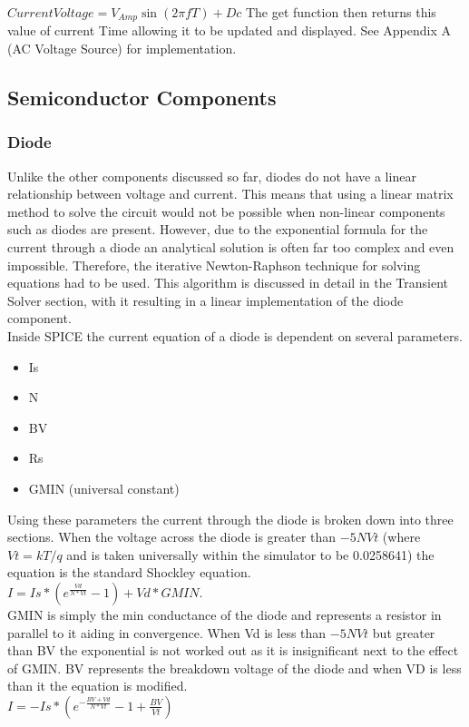 \documentclass{article}
\begin{document}
$ CurrentVoltage = V_{Amp}  \sin{(2\pi f T)} + Dc $
\medbreak
The get function then returns this value of current Time allowing it to be updated and displayed.
\bigbreak
See Appendix A (AC Voltage Source) for implementation.
\newpage

\subsection{Semiconductor Components}
\subsubsection{Diode}
Unlike the other components discussed so far, diodes do not have a linear relationship between voltage and current. This means that using a linear matrix method to solve the circuit would not be possible when non-linear components such as diodes are present. However, due to the exponential formula for the current through a diode an analytical solution is often far too complex and even impossible. Therefore, the iterative Newton-Raphson technique for solving equations had to be used. This algorithm is discussed in detail in the Transient Solver section, with it resulting in a linear implementation of the diode component.
\\
Inside SPICE the current equation of a diode is dependent on several parameters. 
\begin{itemize}
    \item Is
    \item N
    \item BV
    \item Rs
    \item GMIN (universal constant)
\end{itemize}
Using these parameters the current through the diode is broken down into three sections. When the voltage across the diode is greater than $-5NVt$ (where $Vt = kT/q$ and is taken universally within the simulator to be 0.0258641) the equation is the standard Shockley equation.\bigbreak \\ $I = Is*(e^{\frac{Vd}{N*Vt}}-1) + Vd*GMIN$. \\\bigbreak GMIN is simply the min conductance of the diode and represents a resistor in parallel to it aiding in convergence. When Vd is less than $-5NVt$ but greater than BV the exponential is not worked out as it is insignificant next to the effect of GMIN. BV represents the breakdown voltage of the diode and when VD is less than it the equation is modified.\bigbreak
\\$I = -Is*(e^{-\frac{BV+Vd}{N*Vt}}-1+\frac{BV}{Vt})$\\\bigbreak
\end{document}
